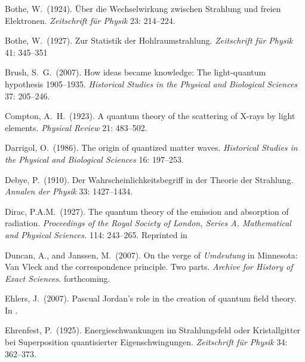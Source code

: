 \documentclass[12pt]{elsart}
\begin{document}
{\begin{thebibliography}{}
 Bothe, W.\ (1924). \"Uber die Wechselwirkung zwischen Strahlung und freien Elektronen. {\it Zeitschrift f\"ur Physik} 23: 214--224.

 Bothe, W.\ (1927). Zur Statistik der Hohlraumstrahlung. {\it Zeitschrift f\"ur Physik} 41: 345--351


 Brush, S.\ G.\ (2007). How ideas became knowledge: The light-quantum hypothesis 1905--1935. {\it Historical Studies in the Physical and Biological Sciences} 37: 205--246.

 Compton, A.\ H.\ (1923). A quantum theory of the scattering of X-rays by light elements. {\it Physical Review} 21: 483--502.

 Darrigol, O.\ (1986). The origin of quantized matter waves. {\it Historical Studies in the Physical and Biological Sciences} 16: 197--253.

 Debye, P.\ (1910). Der Wahrscheinlichkeitsbegriff in der Theorie der Strahlung. {\it Annalen der Physik} 33: 1427--1434.

 Dirac, P.A.M.\ (1927).  The quantum theory of the emission and absorption of radiation. {\it Proceedings of the Royal Society of London, Series A, Mathematical and Physical Sciences.} 114: 243--265. Reprinted in \citep[pp.\ 1--23]{Schwinger 1958}

 Duncan, A., and Janssen, M.\  (2007). On the verge of {\it Umdeutung} in Minnesota: Van Vleck and the correspondence principle. Two parts. {\it Archive for History of Exact Sciences.} forthcoming.

 Ehlers, J.\ (2007). Pascual Jordan's role in the creation of quantum field theory. In \citep[pp.\ 23--35]{Hoffmann 2007}. 


 Ehrenfest, P.\ (1925). Energieschwankungen im Strahlungsfeld oder Kristallgitter bei Superposition quantisierter Eigenschwingungen. 
{\it Zeitschrift f\"{u}r Physik} 34: 362--373.



\end{thebibliography}}
\end{document}
